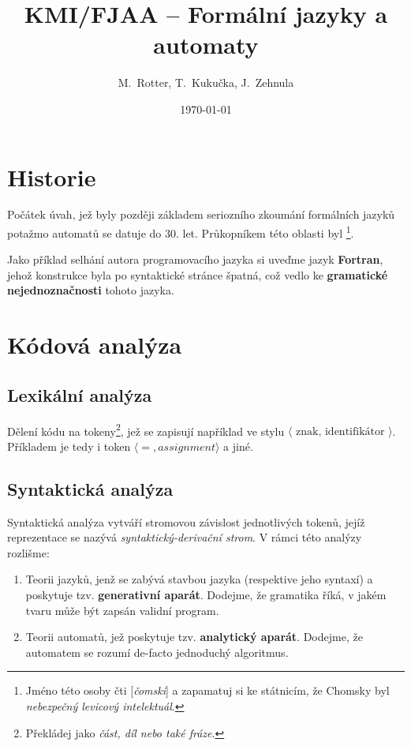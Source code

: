 \documentclass[10pt, a4paper, titlepage]{article}
\title{KMI/FJAA  -- Formální jazyky a automaty}
\author{M.~Rotter, T.~Kukučka, J.~Zehnula}
\date{\today}
\theoremstyle{note}
\begin{document}
\maketitle

\section{Historie}
Počátek úvah, jež byly později základem seriozního zkoumání formálních jazyků potažmo automatů se datuje do 30. let.
Průkopníkem této oblasti byl 
\footnote{Jméno této osoby čti [\emph{čomski}] a zapamatuj si ke státnicím, že Chomsky byl \emph{nebezpečný levicový intelektuál}.}.

Jako příklad selhání autora programovacího jazyka si uveďme jazyk \textbf{Fortran}, jehož konstrukce byla po syntaktické stránce špatná,
což vedlo ke \textbf{gramatické nejednoznačnosti} tohoto jazyka.

\section{Kódová analýza}
\subsection{Lexikální analýza}
Dělení kódu na tokeny\footnote{Překládej jako \emph{část, díl nebo také fráze}.}, jež se zapisují například ve stylu
$\langle\text{ znak, identifikátor }\rangle$.
Příkladem je tedy i token $\langle =, assignment \rangle$ a jiné.

\subsection{Syntaktická analýza}
Syntaktická analýza vytváří stromovou závislost jednotlivých tokenů, jejíž reprezentace se nazývá \emph{syntaktický-derivační strom}.
V rámci této analýzy rozlišme:
\begin{enumerate}
\item
Teorii jazyků, jenž se zabývá stavbou jazyka (respektive jeho syntaxí) a poskytuje tzv. \textbf{generativní aparát}.
Dodejme, že gramatika říká, v jakém tvaru může být zapsán validní program.

\item
Teorii automatů, jež poskytuje tzv. \textbf{analytický aparát}.
Dodejme, že automatem se rozumí de-facto jednoduchý algoritmus.
\end{enumerate}
\end{document}
